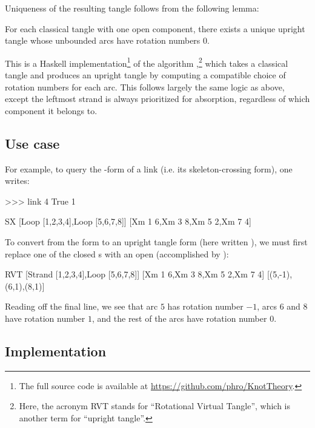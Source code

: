 Uniqueness of the resulting tangle follows from the following lemma:
\begin{lemma}
        For each classical tangle with one open component, there exists a unique
        upright tangle whose unbounded arcs have rotation numbers $0$.
\end{lemma}

This is a Haskell implementation\footnote{The full source code is available at
\url{https://github.com/phro/KnotTheory}.} of the algorithm ,\footnote{Here, the
acronym RVT stands for \enquote{Rotational Virtual Tangle}, which is
another term for \enquote{upright tangle}.} which takes a classical tangle and
produces an upright tangle by computing a compatible choice of rotation numbers
for each arc. This follows largely the same logic as above, except the leftmost
strand is always prioritized for absorption, regardless of which component it
belongs to.

\subsection{Use case}

For example, to query the -form of a link (i.e. its skeleton-crossing
form), one writes:
\begin{code}
>>> link 4 True 1
\end{code}
\begin{code}
SX [Loop [1,2,3,4],Loop [5,6,7,8]]
   [Xm 1 6,Xm 3 8,Xm 5 2,Xm 7 4]
\end{code}
To convert from the  form to an upright tangle form (here written
), we must first replace one of the closed s with an open
 (accomplished by ):
\begin{code}
RVT [Strand [1,2,3,4],Loop [5,6,7,8]]
    [Xm 1 6,Xm 3 8,Xm 5 2,Xm 7 4]
    [(5,-1),(6,1),(8,1)]
\end{code}
Reading off the final line, we see that arc $5$ has rotation number $-1$, arcs
$6$ and $8$ have rotation number $1$, and the rest of the arcs have rotation
number $0$.

\subsection{Implementation}


